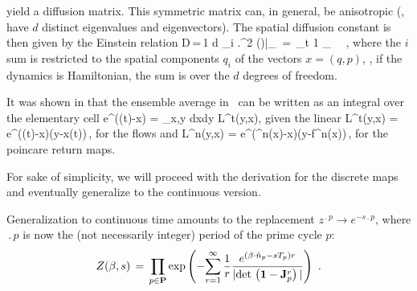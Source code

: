yield a diffusion matrix.  This symmetric matrix can, in general, be
anisotropic (\ie, have $d$ distinct eigenvalues and eigen\-vectors). The
spatial diffusion constant is then given by the Einstein relation
\beq
D\,=\,{1 d} \sum_i \left .{{\partial}^2 } \eigenvL(\beta)\right |_{} \,=\,
\lim_{t\rightarrow \infty} {1} 
\rangle_\pS~ ~,
\eeq
where the $i$ sum is restricted to the spatial components $q_i$ of
the {\statesp} vectors $x=(q,p)$, \ie, if the dynamics is Hamiltonian, the
sum is over the $d$ degrees of freedom.


It was shown in  that the ensemble average in~ can be written as an integral over the elementary cell
\beq
\langle e^{\beta\cdot(\hx(t)-x)} \rangle
   = \int_{x,y\in \pS} dxdy {\cal L}^t(y,x),
\eeq
given the linear \evOper
\beq
{\cal L}^t(y,x) = e^{\beta\cdot(\hx(t)-x)}\delta(y-x(t))\,,
\label{eq-eOper}
\eeq
for the flows and
\beq
{\cal L}^n(y,x) = e^{\beta\cdot(^n(x)-x)}\delta(y-f^n(x))\,,
\label{eq-eOperDisc}
\eeq 
for the poincare return maps.

For sake of simplicity, we will proceed with the derivation for the discrete maps and eventually generalize to the continuous version.



Generalization to continuous time amounts to the replacement
$ z^{\period{p}} \rightarrow e^{-s \period{p}} $,
where $\period{p}$ is now the (not necessarily integer)
period of the prime cycle $p$:
$$
Z(\beta,s)\,=\,\prod_{p\in\PP} \exp \left( - {
 \sum_{r=1}^\infty {1 \over r}
 { e^{(\beta \cdot \hn_p- s \period{p}) r } %
 \over { | \det \left( {\bf 1}-{\bf J}_p^{r} \right) | } }
 } \right)
\,\, .
$$


